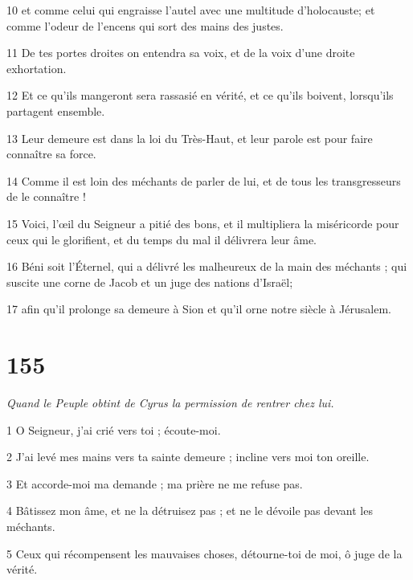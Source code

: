 \par 10 et comme celui qui engraisse l'autel avec une multitude d'holocauste; et comme l'odeur de l'encens qui sort des mains des justes.

\par 11 De tes portes droites on entendra sa voix, et de la voix d'une droite exhortation.

\par 12 Et ce qu'ils mangeront sera rassasié en vérité, et ce qu'ils boivent, lorsqu'ils partagent ensemble.

\par 13 Leur demeure est dans la loi du Très-Haut, et leur parole est pour faire connaître sa force.

\par 14 Comme il est loin des méchants de parler de lui, et de tous les transgresseurs de le connaître !

\par 15 Voici, l'œil du Seigneur a pitié des bons, et il multipliera la miséricorde pour ceux qui le glorifient, et du temps du mal il délivrera leur âme.

\par 16 Béni soit l'Éternel, qui a délivré les malheureux de la main des méchants ; qui suscite une corne de Jacob et un juge des nations d'Israël;

\par 17 afin qu'il prolonge sa demeure à Sion et qu'il orne notre siècle à Jérusalem.

\chapter{155}

\par \textit{Quand le Peuple obtint de Cyrus la permission de rentrer chez lui.}

\par 1 O Seigneur, j'ai crié vers toi ; écoute-moi.

\par 2 J'ai levé mes mains vers ta sainte demeure ; incline vers moi ton oreille.

\par 3 Et accorde-moi ma demande ; ma prière ne me refuse pas.

\par 4 Bâtissez mon âme, et ne la détruisez pas ; et ne le dévoile pas devant les méchants.

\par 5 Ceux qui récompensent les mauvaises choses, détourne-toi de moi, ô juge de la vérité.

